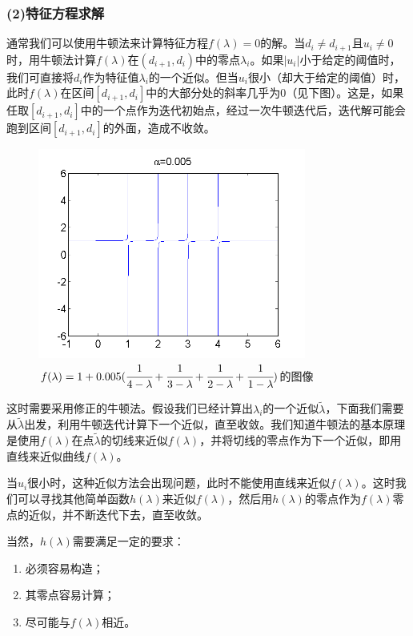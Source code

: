 \documentclass[notheorems,serif]{beamer}
\begin{document}
\begin{frame}
\frametitle{(2)特征方程求解}


通常我们可以使用牛顿法来计算特征方程$f(\lambda)=0$的解。当$d_i\neq d_{i+1}$且$u_i\neq 0$时，用牛顿法计算$f(\lambda)$在$(d_{i+1},d_i)$中的零点$\lambda _i$。如果$|u_i|$小于给定的阈值时，我们可直接将$d_i$作为特征值$\lambda _i$的一个近似。但当$u_i$很小（却大于给定的阈值）时，此时$f(\lambda)$在区间$[d_{i+1},d_i]$中的大部分处的斜率几乎为0（见下图）。这是，如果任取$[d_{i+1},d_i]$中的一个点作为迭代初始点，经过一次牛顿迭代后，迭代解可能会跑到区间$[d_{i+1},d_i]$的外面，造成不收敛。
\begin{figure}[H]
	\centering
	\includegraphics[scale=0.4]{figures/5-5.png}
	\caption{$f(\lambda)=1+0.005(\cfrac{1}{4-\lambda}+\cfrac{1}{3-\lambda}+\cfrac{1}{2-\lambda}+\cfrac{1}{1-\lambda})$的图像}
\end{figure}
\end{frame}
\begin{frame}
这时需要采用修正的牛顿法。假设我们已经计算出$\lambda _i$的一个近似$\tilde{\lambda}$，下面我们需要从$\tilde{\lambda}$出发，利用牛顿迭代计算下一个近似，直至收敛。我们知道牛顿法的基本原理是使用$f(\lambda)$在点$\tilde{\lambda}$的切线来近似$f(\lambda)$，并将切线的零点作为下一个近似，即用直线来近似曲线$f(\lambda)$。

当$u_i$很小时，这种近似方法会出现问题，此时不能使用直线来近似$f(\lambda)$。这时我们可以寻找其他简单函数$h(\lambda)$来近似$f(\lambda)$，然后用$h(\lambda)$的零点作为$f(\lambda)$零点的近似，并不断迭代下去，直至收敛。

当然，$h(\lambda)$需要满足一定的要求：
\begin{enumerate}[（1）]
	\item 必须容易构造；
	\item 其零点容易计算；
	\item 尽可能与$f(\lambda)$相近。
\end{enumerate}
\end{frame}
\end{document}
